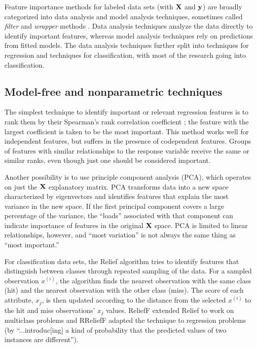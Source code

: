 \documentclass[11pt]{article}
\renewcommand{\xi}{x^{(i)}}
\begin{document}
Feature importance methods for labeled data sets (with $\bf X$ and $\bf y$) are broadly categorized into data analysis and model analysis techniques, sometimes called {\em filter} and {\em wrapper} methods \citep{tsanas}. Data analysis techniques analyze the data directly to identify important features, whereas model analysis techniques rely on predictions from fitted models.  The data analysis techniques further split into techniques for regression and techniques for classification, with most of the research going into classification.

\subsection{Model-free and nonparametric techniques}

The simplest technique to identify important or relevant regression features is to rank them by their Spearman's rank correlation coefficient \citep{spearmans}; the feature with the largest coefficient is taken to be the most important. This method works well for independent features, but suffers in the presence of codependent features.   Groups of features with similar relationships to the response variable receive the same or similar ranks, even though just one should be considered important.

Another possibility is to use principle component analysis (PCA), which operates on just the $\bf X$ explanatory matrix. PCA transforms data into a new space characterized by eigenvectors and identifies features that explain the most variance in the new space. If the first principal component covers a large percentage of the variance, the ``loads'' associated with that component can indicate importance of features in the original $\bf X$ space. PCA is limited to linear relationships, however, and ``most variation'' is not always the same thing as ``most important.''

For classification data sets, the Relief algorithm \citep{relief} tries to identify features that distinguish between classes through repeated sampling of the data. For a sampled observation $\xi$, the algorithm finds the nearest observation with the same class (hit) and the nearest observation with the other class (miss). The score of each attribute, $x_j$, is then updated according to the distance from the selected $\xi$ to the hit and miss observations'  $x_j$ values. ReliefF \citep{ReliefF} extended Relief to work on multiclass problems and RReliefF \citep{RReliefF} adapted the technique to regression problems (by ``...introduc[ing] a kind of probability that the predicted values of two instances are different'').
\end{document}

